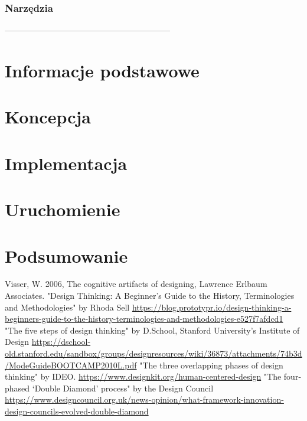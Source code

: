 \documentclass[a4paper,titleauthor]{mwart}
\begin{document}
\subsubsection{Narzędzia}
\label{sec:narzędzia}

------------------------------------------------------------
\section{Informacje podstawowe}
\label{sec:informacje_podstawowe}

\section{Koncepcja}
\label{sec:koncepcja}

\section{Implementacja}
\label{sec:implementacja}


\section{Uruchomienie}
\label{sec:uruchomienie}

	
\section{Podsumowanie}
\label{sec:podsumowanie}



\begin{thebibliography}{SYCYfProjekt}
 Visser, W. 2006, The cognitive artifacts of designing, Lawrence Erlbaum Associates.
"Design Thinking: A Beginner’s Guide to the History, Terminologies and Methodologies" by Rhoda Sell \url{https://blog.prototypr.io/design-thinking-a-beginners-guide-to-the-history-terminologies-and-methodologies-e527f7afdcd1}
"The five steps of design thinking" by D.School, Stanford University’s Institute of Design \url{https://dschool-old.stanford.edu/sandbox/groups/designresources/wiki/36873/attachments/74b3d/ModeGuideBOOTCAMP2010L.pdf}
"The three overlapping phases of design thinking" by IDEO. \url{https://www.designkit.org/human-centered-design}
"The four-phased ‘Double Diamond’ process" by the Design Council \url{https://www.designcouncil.org.uk/news-opinion/what-framework-innovation-design-councils-evolved-double-diamond}
\end{thebibliography}
\end{document}
